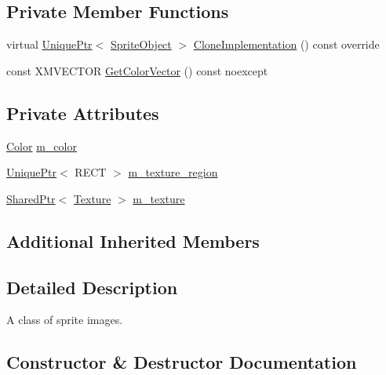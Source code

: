 \subsection*{Private Member Functions}
\begin{DoxyCompactItemize}
\item 
virtual \hyperlink{namespacemage_a8c307fbcc33bce9b7f2aa4c26c3b95cf}{Unique\+Ptr}$<$ \hyperlink{classmage_1_1_sprite_object}{Sprite\+Object} $>$ \hyperlink{classmage_1_1_sprite_image_a61e61349fd3435616893aae787feff37}{Clone\+Implementation} () const override
\item 
const X\+M\+V\+E\+C\+T\+OR \hyperlink{classmage_1_1_sprite_image_a65e6a26e2589afa2c6ccc463e7dd4264}{Get\+Color\+Vector} () const noexcept
\end{DoxyCompactItemize}
\subsection*{Private Attributes}
\begin{DoxyCompactItemize}
\item 
\hyperlink{structmage_1_1_color}{Color} \hyperlink{classmage_1_1_sprite_image_a63331a3170f5af1a14b15913afc59ce2}{m\+\_\+color}
\item 
\hyperlink{namespacemage_a8c307fbcc33bce9b7f2aa4c26c3b95cf}{Unique\+Ptr}$<$ R\+E\+CT $>$ \hyperlink{classmage_1_1_sprite_image_a8d20ef6d6470dc01f73a599060953b65}{m\+\_\+texture\+\_\+region}
\item 
\hyperlink{namespacemage_a1e01ae66713838a7a67d30e44c67703e}{Shared\+Ptr}$<$ \hyperlink{classmage_1_1_texture}{Texture} $>$ \hyperlink{classmage_1_1_sprite_image_a8416fc862782dc019e15275261e7ca15}{m\+\_\+texture}
\end{DoxyCompactItemize}
\subsection*{Additional Inherited Members}


\subsection{Detailed Description}
A class of sprite images. 

\subsection{Constructor \& Destructor Documentation}
\hypertarget{classmage_1_1_sprite_image_ab94d36963a20b768167c92d5ae1ed116}{}\label{classmage_1_1_sprite_image_ab94d36963a20b768167c92d5ae1ed116} 
